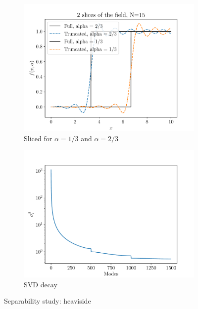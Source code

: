 \begin{figure}
\begin{subfigure}[t]{0.5\linewidth}
    \includegraphics[width=\linewidth]{Figures/Sliced_TruncatedField_15_Heaviside.pdf}
    \caption{Sliced for $\alpha = 1/3$ and $\alpha = 2/3$}
\end{subfigure} 
  \begin{subfigure}[t]{0.5\linewidth}
    \centering
    \includegraphics[width=\linewidth]{Figures/SVD_Decay_Heaviside.pdf}
    \caption{SVD decay}
\end{subfigure} 
\caption{Separability study: heaviside}
    \label{Separability_Heaviside}
\end{figure}

